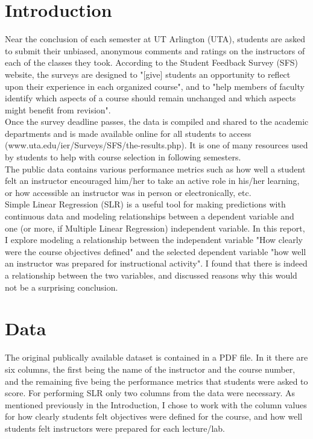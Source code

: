 \documentclass[10pt]{report}
\begin{document}
\section*{Introduction}
Near the conclusion of each semester at UT Arlington (UTA), students are asked to submit their unbiased, anonymous comments
and ratings on the instructors of each of the classes they took. According to the Student Feedback Survey (SFS) website, 
the surveys are designed to "[give] students an opportunity to reflect upon their experience in each organized course", and
to "help members of faculty identify which aspects of a course should remain unchanged and which aspects might benefit
from revision". \\ 
Once the survey deadline passes, the data is compiled and shared to the academic departments and is made available online
for all students to access (www.uta.edu/ier/Surveys/SFS/the-results.php). It is one of many resources used by students to help
with course selection in following semesters.  \\
The public data contains various performance metrics such as how well a student felt an instructor encouraged
him/her to take an active role in his/her learning, or how accessible an instructor was in person or electronically, etc. \\
Simple Linear Regression (SLR) is a useful tool for making predictions with continuous data and modeling relationships between
a dependent variable and one (or more, if Multiple Linear Regression) independent variable.
In this report, I explore modeling a relationship between the independent variable "How clearly were the course objectives defined"
and the selected dependent variable "how well an instructor was prepared for instructional activity". I found that there is
indeed a relationship between the two variables, and discussed reasons why this would not be a surprising conclusion.

\newpage

\section*{Data}
The original publically available dataset is contained in a PDF file. In it there are six columns, the first being the 
name of the instructor and the course number, and the remaining five being the performance metrics that students were asked
to score. For performing SLR only two columns from the data were necessary. As mentioned previously in the Introduction,
I chose to work with the column values for how clearly students felt objectives were defined for the course, and how 
well students felt instructors were prepared for each lecture/lab. \\ 
\end{document}
